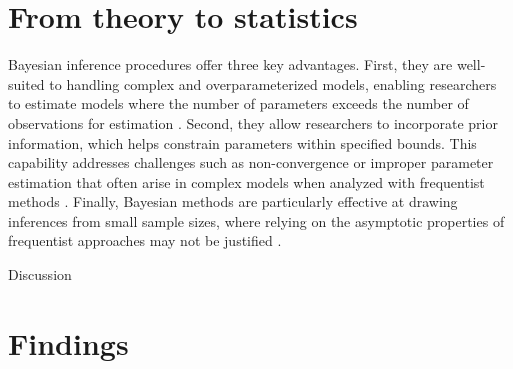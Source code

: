 \documentclass[
  authoryear,
  review,
  1p]{elsarticle}
\begin{document}
\begin{figure}


\caption{\label{fig-CJ_TM_15}}

\end{figure}%

\section{From theory to statistics}\label{sec-theory-statistics}

Bayesian inference procedures offer three key advantages. First, they
are well-suited to handling complex and overparameterized models,
enabling researchers to estimate models where the number of parameters
exceeds the number of observations for estimation
\citep{Baker_1998, Kim_et_al_1999}. Second, they allow researchers to
incorporate prior information, which helps constrain parameters within
specified bounds. This capability addresses challenges such as
non-convergence or improper parameter estimation that often arise in
complex models when analyzed with frequentist methods
\citep{Martin_et_al_1975, Seaman_et_al_2011}. Finally, Bayesian methods
are particularly effective at drawing inferences from small sample
sizes, where relying on the asymptotic properties of frequentist
approaches may not be justified
\citep{Baldwin_et_al_2013, Lambert_et_al_2006, Depaoli_2014}.

Discussion

\section{Findings}\label{sec-discuss-finding}
\end{document}
